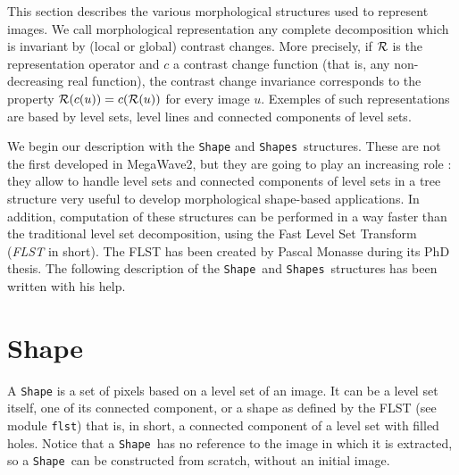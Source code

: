 %
%

This section describes the various morphological structures used to represent
images. We call morphological representation
 any complete decomposition which
is invariant by (local or global) contrast changes. More precisely, 
if $\cal R$ is the representation operator and $c$ a contrast change function
 (that is, any non-decreasing real function), the contrast change
 invariance 
corresponds to the property ${\cal R}(c(u)) = c({\cal R}(u))$ for every image $u$.
Exemples of such representations are based by level sets, level lines and connected
components of level sets.

\def\shape{{\tt Shape}}
\def\shapes{{\tt Shapes}}

We begin our description with the \shape{} and \shapes\ structures. These are not
the first developed in MegaWave2, but they are going to play an increasing role :
they allow to handle level sets and connected components of level sets in a tree
structure very useful to develop morphological shape-based applications.
In addition, computation of these structures can be performed in a way faster
than the traditional level set decomposition, using the Fast Level Set
Transform ({\em FLST} in short).
The FLST has been created by Pascal Monasse during its PhD thesis.
The following description of the \shape\ and \shapes\ structures has been
written with his help.
 
\section{Shape}


\label{shape}

A \shape\index{structure!\shape} is a set of pixels based on a level set of an
image. It can be a level set itself, one of its connected component,
or a shape as defined by the FLST (see module \verb+flst+) that is,
in short, a connected component of a level set with filled holes.
Notice that a \shape\ has no reference to the image in which it is extracted,
so a \shape\ can be constructed from scratch, without an initial image.

